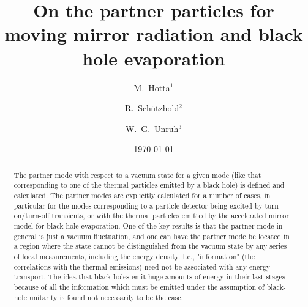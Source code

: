 \documentclass[aps,prd,showpacs,amssymb,nofootinbib,12pt]{revtex4-2}
\begin{document}
\title{
On the partner particles for moving mirror radiation and black hole evaporation}

\author{M.~Hotta$^1$}
\author{ R.~Sch\"utzhold$^2$}
\author{W.~G.~Unruh$^3$}


\date{\today}

\begin{abstract}
The partner mode with respect to a vacuum state for a given mode (like
that corresponding to one of the thermal particles emitted by a black hole) 
is defined and calculated. 
%
The partner modes are explicitly calculated for a number of cases, 
in particular for the modes corresponding to a particle detector being 
excited by turn-on/turn-off transients, or with the thermal particles 
emitted by the accelerated mirror model for black hole evaporation. 
%
One of the key results is that the partner mode in general is just a vacuum 
fluctuation, and one can have the partner mode be located in a region where 
the state cannot be distinguished from the vacuum state by any series of 
local measurements, including the energy density. 
%
I.e., "information" (the correlations with the thermal emissions) need not be 
associated with any energy transport. 
%
The idea that black holes emit huge amounts of energy in their last stages 
because of all the information which must be emitted under the assumption 
of black-hole unitarity is found not necessarily to be the case.
\end{abstract}


\maketitle
\newpage
\end{document}
